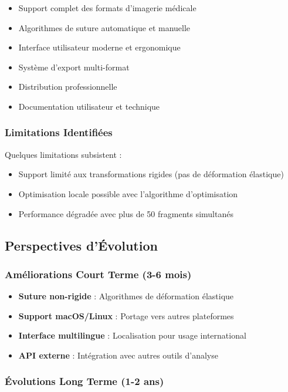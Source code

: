 \documentclass[12pt,a4paper]{article}
\begin{document}
\begin{itemize}
\item Support complet des formats d'imagerie médicale
\item Algorithmes de suture automatique et manuelle
\item Interface utilisateur moderne et ergonomique
\item Système d'export multi-format
\item Distribution professionnelle
\item Documentation utilisateur et technique
\end{itemize}

\subsubsection{Limitations Identifiées}

Quelques limitations subsistent :
\begin{itemize}
\item Support limité aux transformations rigides (pas de déformation élastique)
\item Optimisation locale possible avec l'algorithme d'optimisation
\item Performance dégradée avec plus de 50 fragments simultanés
\end{itemize}

\subsection{Perspectives d'Évolution}

\subsubsection{Améliorations Court Terme (3-6 mois)}

\begin{itemize}
\item \textbf{Suture non-rigide} : Algorithmes de déformation élastique
\item \textbf{Support macOS/Linux} : Portage vers autres plateformes
\item \textbf{Interface multilingue} : Localisation pour usage international
\item \textbf{API externe} : Intégration avec autres outils d'analyse
\end{itemize}

\subsubsection{Évolutions Long Terme (1-2 ans)}
\end{document}
